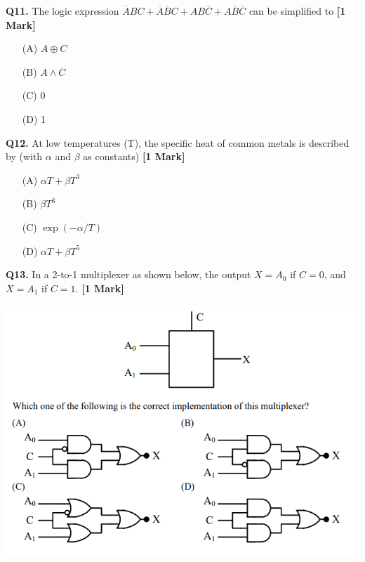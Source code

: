 \documentclass[11pt]{article}
\newcommand{\questiona}[2]{
    \noindent\textbf{Q#2.} #1 \hfill \textbf{[1 Mark]}
}
\begin{document}
\questiona{The logic expression \(\overline{A}BC + \overline{A}\overline{B}C + AB\overline{C} + A\overline{B}\overline{C}\) can be simplified to}{11}
\begin{enumerate}
    \item[(A)] \(A \oplus C\)  
    \item[(B)] \(A \land \overline{C}\)  
    \item[(C)] 0  
    \item[(D)] 1  
\end{enumerate}
\vspace{0.5cm}

\questiona{At low temperatures (T), the specific heat of common metals is described by (with \(\alpha\) and \(\beta\) as constants)}{12}
\begin{enumerate}
    \item[(A)] \(\alpha T + \beta T^3\)  
    \item[(B)] \(\beta T^3\)  
    \item[(C)] \(\exp(-\alpha/T)\)  
    \item[(D)] \(\alpha T + \beta T^5\)  
\end{enumerate}
\vspace{0.5cm}

\questiona{In a 2-to-1 multiplexer as shown below, the output \(X = A_0\) if \(C = 0\), and \(X = A_1\) if \(C = 1\). }{13}
\begin{center}
\includegraphics[width=1\textwidth]{figures/13.png}
\end{center}

\vspace{0.5cm}
\end{document}
